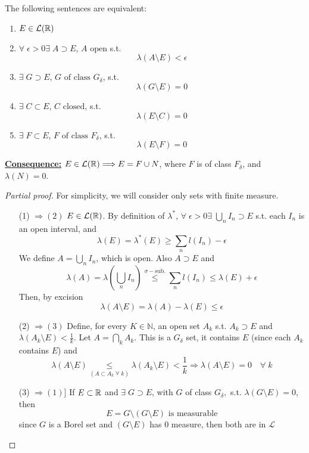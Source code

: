 \begin{theorem}
    The following sentences are equivalent:
    \begin{enumerate}
        \item \(E \in \mathcal{L}(\mathbb{R})\)
        \item \(\forall \; \epsilon > 0 \exists \; A \supset E\), \(A \mbox{ open}\) s.t.
        \[
            \lambda \left(A \setminus E\right) < \epsilon
        \]
        \item \(\exists \; G \supset E\), \(G \mbox{ of class } G_{\delta}\), s.t. 
        \[
            \lambda(G\setminus E) = 0
        \]
        \item \(\exists \; C \subset E\), \(C \mbox{ closed}\), s.t. 
        \[
            \lambda(E\setminus C) = 0
        \]
        \item \(\exists \; F \subset E\), \(F \mbox{ of class } F_{\delta}\), s.t. 
        \[
            \lambda(E\setminus F) = 0
        \]
    \end{enumerate}
\end{theorem}
\underline{\textbf{Consequence:}} \(E \in \mathcal{L}(\mathbb{R}) \Longrightarrow E = F \cup N\), where \(F\) is of class \(F_{\delta}\), and \(\lambda(N) = 0\).
\begin{proof}[Partial proof]
    For simplicity, we will consider only sets with finite measure.
    \begin{itemize}
        \item[(1)]\( \Rightarrow (2)\) \(E \in \mathcal{L}(\mathbb{R})\). By definition of \(\lambda^*\), \(\forall \; \epsilon > 0 \exists \; \bigcup_n I_n \supset E\) s.t. each \(I_n\) is an open interval, and 
        \[
            \lambda(E) = \lambda^*(E) \geq \sum_n l(I_n) -\epsilon
        \]
        We define \(A = \bigcup_n I_n\), which is open. Also \(A \supset E\) and 
        \[
            \lambda(A)= \lambda\left(\bigcup_n I_n\right) \overset{\sigma-\mbox{sub.}}{\leq} \sum_n l(I_n) \leq \lambda(E) + \epsilon
        \]
        Then, by excision
        \[
            \lambda(A \setminus E) = \lambda(A) - \lambda(E) \leq \epsilon
        \]
        \item[(2)]\( \Rightarrow (3)\) Define, for every \(K \in \mathbb{N}\), an open set \(A_k\) s.t. \(A_k \supset E\) and \(\lambda(A_k \setminus E) < \frac{1}{k}\). Let \(A = \bigcap_k A_k\). This is a \(G_{\delta}\) set, it contains \(E\) (since each \(A_k\) contains \(E\)) and 
        \[
            \lambda(A \setminus E) \underset{(A \subset A_k \; \forall \; k)}{\leq} \lambda(A_k \setminus E) < \frac{1}{k} \Longrightarrow \lambda(A \setminus E) = 0 \quad \forall \; k
        \]
        \item[(3)]\( \Rightarrow (1)\)] If \(E \subset \mathbb{R}\) and \(\exists\; G \supset E\), with \(G\) of class \(G_{\delta},\) s.t. \(\lambda(G \setminus E) = 0\), then
        \[
            E = G \setminus(G \setminus E) \mbox{ is measurable}
        \]
        since \(G\) is a Borel set and \((G \setminus E)\) has \(0\) measure, then both are in \(\mathcal{L}\)
    \end{itemize}
\end{proof}
